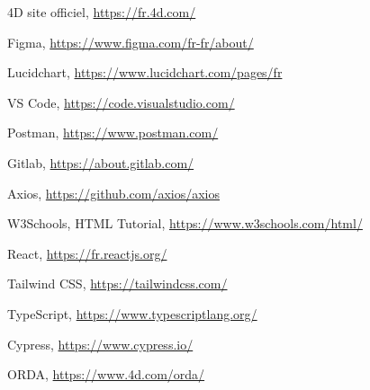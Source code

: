 
\begin{thebibliography}{9}
    
    4D site officiel,     
    \href{https://fr.4d.com/}{https://fr.4d.com/}
   
    Figma, 
    \href{https://www.figma.com/fr-fr/about/}{https://www.figma.com/fr-fr/about/}
    
    Lucidchart,
    \href{https://www.lucidchart.com/pages/fr}{https://www.lucidchart.com/pages/fr}
    
    VS Code,
    \href{https://code.visualstudio.com/}{https://code.visualstudio.com/}
    
    Postman,
    \href{https://www.postman.com/}{https://www.postman.com/}

    Gitlab,
    \href{https://about.gitlab.com/}{https://about.gitlab.com/}

    Axios,
    \href{https://github.com/axios/axios}{https://github.com/axios/axios}
    
    W3Schools, HTML Tutorial,
    \href{https://www.w3schools.com/html/}{https://www.w3schools.com/html/}
    
    React,
    \href{https://fr.reactjs.org/}{https://fr.reactjs.org/}
    
    Tailwind CSS,
    \href{https://tailwindcss.com/}{https://tailwindcss.com/}
    
    TypeScript,
    \href{https://www.typescriptlang.org/}{https://www.typescriptlang.org/}
    
    Cypress,
    \href{https://www.cypress.io/}{https://www.cypress.io/}
    
    ORDA,
    \href{https://www.4d.com/orda/}{https://www.4d.com/orda/}


    
\end{thebibliography}
